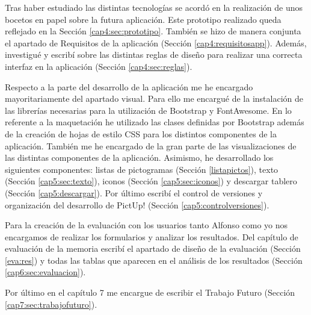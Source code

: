 Tras haber estudiado las distintas tecnologías se acordó en la realización de unos bocetos en papel sobre la futura aplicación. Este prototipo realizado queda reflejado en la Sección \ref{cap4:sec:prototipo}. También se hizo de manera conjunta el apartado de Requisitos de la aplicación (Sección \ref{cap4:requisitosapp}). Además, investigué y escribí sobre las distintas reglas de diseño para realizar una correcta interfaz en la aplicación (Sección \ref{cap4:sec:reglas}).


Respecto a la parte del desarrollo de la aplicación me he encargado mayoritariamente del apartado visual. Para ello me encargué de la instalación de las librerías necesarias para la utilización de Bootstrap y FontAwesome. En lo referente a la maquetación he utilizado las clases definidas por Bootstrap además de la creación de hojas de estilo CSS para los distintos componentes de la aplicación. También me he encargado de la gran parte de las visualizaciones de las distintas componentes de la aplicación. Asimismo, he desarrollado los siguientes componentes: listas de pictogramas (Sección \ref{listapictos}), texto (Sección \ref{cap5:sec:texto}), iconos (Sección \ref{cap5:sec:iconos}) y descargar tablero (Sección \ref{cap5:descargar}). Por último escribí el control de versiones y organización del desarrollo de PictUp! (Sección \ref{cap5:controlversiones}).


Para la creación de la evaluación con los usuarios tanto Alfonso como yo nos encargamos de realizar los formularios y analizar los resultados. Del capítulo de evaluación de la memoria escribí el apartado de diseño de la evaluación (Sección \ref{eva:res}) y todas las tablas que aparecen en el análisis de los resultados (Sección \ref{cap6:sec:evaluacion}).


Por último en el capítulo 7 me encargue de escribir el Trabajo Futuro (Sección \ref{cap7:sec:trabajofuturo}).












